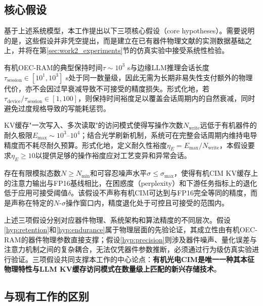 \subsection{核心假设}

基于上述系统模型，本工作提出以下三项核心假设（core hypotheses）。需要说明的是，这些假设并非凭空提出，而是建立在已有器件物理文献的实测数据基础之上，并将在第\ref{sec:work2_experiments}节的仿真实验中接受系统性检验。

\begin{hypothesis}[保持时间匹配假设]
有机OEC-RAM的典型保持时间$\tau \sim 10^3$ s与边缘LLM推理会话长度$\tau_{\text{session}} \in [10^1, 10^3]$ s处于同一数量级，因此无需为长期非易失性支付额外的物理代价，亦不会因过早衰减导致不可接受的精度损失。形式化地，若$\tau_{\text{device}} / \tau_{\text{session}} \in [1, 100]$，则保持时间裕度足以覆盖会话周期内的自然衰减，同时避免过度规格导致的写能耗惩罚。
\label{hyp:retention}
\end{hypothesis}

\begin{hypothesis}[耐久性适配假设]
KV缓存"一次写入、多次读取"的访问模式使得写操作次数$N_{\text{write}}$远低于有机器件的耐久极限$E_{\text{max}} \sim 10^3$–$10^4$；结合光学刷新机制，系统可在完整会话周期内维持电导精度而不耗尽耐久预算。形式化地，定义耐久性裕度$\eta_E = E_{\text{max}} / N_{\text{write}}$，本假设要求$\eta_E \geq 10$以提供足够的操作裕度应对工艺变异和异常会话。
\label{hyp:endurance}
\end{hypothesis}

\begin{hypothesis}[模拟精度充分假设]
存在有限模拟态数$N \geq N_{\text{min}}$和可容忍噪声水平$\sigma \leq \sigma_{\text{max}}$，使得有机CIM KV缓存上的注意力输出与FP16基线相比，在困惑度（perplexity）和下游任务指标上的退化低于应用可接受阈值$\delta$。该假设不声称有机CIM可达到与FP16完全等同的精度，而是声称在特定的$N$-$\sigma$操作窗口内，精度退化处于可控且可接受的范围内。
\label{hyp:precision}
\end{hypothesis}

上述三项假设分别对应器件物理、系统架构和算法精度的不同层次。假设\ref{hyp:retention}和\ref{hyp:endurance}属于物理层面的先验论证，其成立性由有机OEC-RAM的器件物理参数直接支撑；假设\ref{hyp:precision}则涉及器件噪声、量化误差与注意力机制之间的复杂耦合，无法仅凭器件参数推断，必须通过行为级仿真实验进行验证。三项假设共同支撑本工作的中心论点：\textbf{有机光电CIM是唯一一种其本征物理特性与LLM KV缓存访问模式在数量级上匹配的新兴存储技术}。

\subsection{与现有工作的区别}

